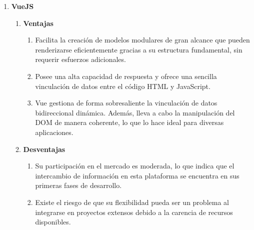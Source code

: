\begin{enumerate}
\begin{enumerate}
          \end{enumerate}
    \item \textbf{VueJS}
          \begin{enumerate}
              \item \textbf{Ventajas}
                    \begin{enumerate}
                        \item Facilita la creación de modelos modulares de gran alcance que pueden renderizarse eficientemente gracias a su estructura fundamental, sin requerir esfuerzos adicionales.
                        \item Posee una alta capacidad de respuesta y ofrece una sencilla vinculación de datos entre el código HTML y JavaScript.
                        \item Vue gestiona de forma sobresaliente la vinculación de datos bidireccional dinámica. Además, lleva a cabo la manipulación del DOM de manera coherente, lo que lo hace ideal para diversas aplicaciones.
                    \end{enumerate}
              \item \textbf{Desventajas}
                    \begin{enumerate}
                        \item Su participación en el mercado es moderada, lo que indica que el intercambio de información en esta plataforma se encuentra en sus primeras fases de desarrollo.
                        \item Existe el riesgo de que su flexibilidad pueda ser un problema al integrarse en proyectos extensos debido a la carencia de recursos disponibles.
                    \end{enumerate}
          \end{enumerate}
\end{enumerate}